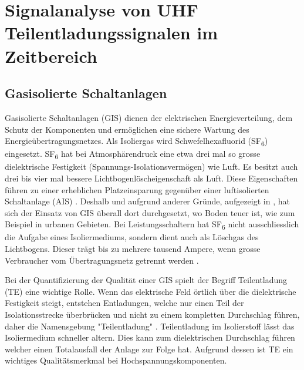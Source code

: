 %
%
%
\chapter{Signalanalyse von UHF Teilentladungssignalen im Zeitbereich \label{chapter:gis}}
\begin{refsection}

\section{Gasisolierte Schaltanlagen}

Gasisolierte Schaltanlagen (GIS) dienen der elektrischen Energieverteilung, dem Schutz der Komponenten und ermöglichen eine sichere Wartung des Energieübertragungsnetzes.
Als Isoliergas wird Schwefelhexafluorid (SF\textsubscript{6}) eingesetzt. SF\textsubscript{6} hat bei Atmosphärendruck eine etwa drei mal so grosse dielektrische Festigkeit (Spannungs-Isolationsvermögen) wie Luft. 
Es besitzt auch drei bis vier mal bessere Lichtbogenlöscheigenschaft als Luft. 
Diese Eigenschaften führen zu einer erheblichen Platzeinsparung gegenüber einer luftisolierten Schaltanlage (AIS) \cite{buch:ABB}.
Deshalb und aufgrund anderer Gründe, aufgezeigt in \cite{buch:GIS/AIS}, hat sich der Einsatz von GIS überall dort durchgesetzt, wo Boden teuer ist, wie zum Beispiel in urbanen Gebieten. 
Bei Leistungsschaltern hat SF\textsubscript{6} nicht ausschliesslich die Aufgabe eines Isoliermediums, sondern dient auch als Löschgas des Lichtbogens.
Dieser trägt bis zu mehrere tausend Ampere, wenn grosse Verbraucher vom Übertragungsnetz getrennt werden \cite{buch:ABB}. 

Bei der Quantifizierung der Qualität einer GIS spielt der Begriff Teilentladung (TE) eine wichtige Rolle. 
Wenn das elektrische Feld örtlich über die dielektrische Festigkeit steigt, entstehen Entladungen, welche nur einen Teil der Isolationsstrecke überbrücken und nicht zu einem kompletten Durchschlag führen, daher die Namensgebung "Teilentladung" \cite{buch:Kuchler}.
Teilentladung im Isolierstoff lässt das Isoliermedium  schneller altern. Dies kann zum dielektrischen Durchschlag führen welcher einen Totalausfall der Anlage zur Folge hat.
Aufgrund dessen ist TE ein wichtiges Qualitätsmerkmal bei Hochspannungskomponenten. 


\end{refsection}
